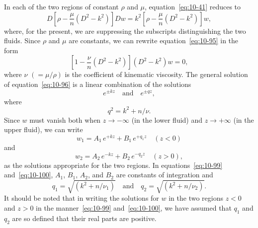In each of the two regions of constant $\rho$ and $\mu$, equation~\eqref{eq:10-41} reduces to
\begin{equation}
\label{eq:10-95}
D\!\left[\rho - \frac{\mu}{n}(D^2-k^2)\right]\!Dw = k^2\!\left[\rho - \frac{\mu}{n}(D^2-k^2)\right]\!w,
\end{equation}
where, for the present, we are suppressing the subscripts distinguishing the two fluids. Since $\rho$ and $\mu$ are constants, we can rewrite equation~\eqref{eq:10-95} in the form
\begin{equation}
\label{eq:10-96}
\left[1-\frac{\nu}{n}(D^2-k^2)\right](D^2-k^2)w = 0,
\end{equation}
where $\nu$ $(= \mu/\rho)$ is the coefficient of kinematic viscosity. The general solution of equation~\eqref{eq:10-96} is a linear combination of the solutions
\begin{equation}
\label{eq:10-97}
e^{\pm kz} \quad\text{and}\quad e^{\pm qz},
\end{equation}
where
\begin{equation}
\label{eq:10-98}
q^2 = k^2+n/\nu.
\end{equation}
Since $w$ must vanish both when $z \to -\infty$ (in the lower fluid) and $z \to +\infty$ (in the upper fluid), we can write
\begin{equation}
\label{eq:10-99}
w_1 = A_1\,e^{+kz}+B_1\,e^{+q_1 z} \quad (z < 0)
\end{equation}
and
\begin{equation}
\label{eq:10-100}
w_2 = A_2\,e^{-kz}+B_2\,e^{-q_2 z} \quad (z > 0),
\end{equation}
as the solutions appropriate for the two regions. In equations~\eqref{eq:10-99} and~\eqref{eq:10-100}, $A_1$, $B_1$, $A_2$, and $B_2$ are constants of integration and
\begin{equation}
\label{eq:10-101}
q_1 = \sqrt{(k^2+n/\nu_1)} \quad\text{and}\quad q_2 = \sqrt{(k^2+n/\nu_2)}.
\end{equation}
It should be noted that in writing the solutions for $w$ in the two regions $z < 0$ and $z > 0$ in the manner~\eqref{eq:10-99} and~\eqref{eq:10-100}, we have assumed that $q_1$ and $q_2$ are so defined that their real parts are positive.

